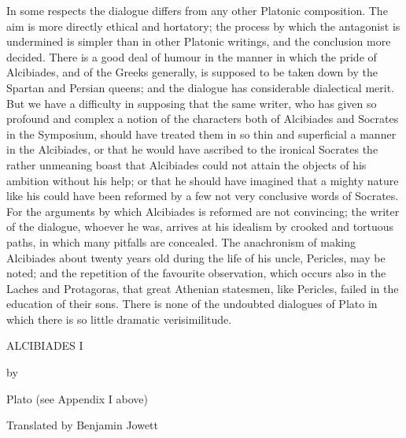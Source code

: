 \documentclass[11pt,letter]{article}
\begin{document}
\par  In some respects the dialogue differs from any other Platonic composition. The aim is more directly ethical and hortatory; the process by which the antagonist is undermined is simpler than in other Platonic writings, and the conclusion more decided. There is a good deal of humour in the manner in which the pride of Alcibiades, and of the Greeks generally, is supposed to be taken down by the Spartan and Persian queens; and the dialogue has considerable dialectical merit. But we have a difficulty in supposing that the same writer, who has given so profound and complex a notion of the characters both of Alcibiades and Socrates in the Symposium, should have treated them in so thin and superficial a manner in the Alcibiades, or that he would have ascribed to the ironical Socrates the rather unmeaning boast that Alcibiades could not attain the objects of his ambition without his help; or that he should have imagined that a mighty nature like his could have been reformed by a few not very conclusive words of Socrates. For the arguments by which Alcibiades is reformed are not convincing; the writer of the dialogue, whoever he was, arrives at his idealism by crooked and tortuous paths, in which many pitfalls are concealed. The anachronism of making Alcibiades about twenty years old during the life of his uncle, Pericles, may be noted; and the repetition of the favourite observation, which occurs also in the Laches and Protagoras, that great Athenian statesmen, like Pericles, failed in the education of their sons. There is none of the undoubted dialogues of Plato in which there is so little dramatic verisimilitude.

\par  ALCIBIADES I

\par  by

\par  Plato (see Appendix I above)

\par  Translated by Benjamin Jowett
 
\end{document}
